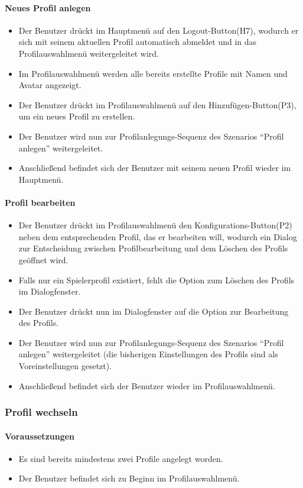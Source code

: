 \paragraph{Neues Profil anlegen}
\begin{itemize}
	\item Der Benutzer drückt im Hauptmenü auf den Logout-Button(H7), wodurch er sich mit seinem aktuellen Profil automatisch abmeldet und in das Profilauswahlmenü weitergeleitet wird.
	\item Im Profilauswahlmenü werden alle bereits erstellte Profile mit Namen und Avatar angezeigt.
	\item Der Benutzer drückt im Profilauswahlmenü auf den Hinzufügen-Button(P3), um ein neues Profil zu erstellen.
	\item Der Benutzer wird nun zur Profilanlegungs-Sequenz des Szenarios "`Profil anlegen"' weitergeleitet.
	\item Anschließend befindet sich der Benutzer mit seinem neuen Profil wieder im Hauptmenü.
\end{itemize}
\paragraph{Profil bearbeiten }
\begin{itemize}
	\item Der Benutzer drückt im Profilauswahlmenü den Konfigurations-Button(P2) neben dem entsprechenden Profil, das er bearbeiten will, wodurch ein Dialog zur Entscheidung zwischen Profilbearbeitung und dem Löschen des Profils geöffnet wird.
	\item Falls nur ein Spielerprofil existiert, fehlt die Option zum Löschen des Profils im Dialogfenster.
	\item Der Benutzer drückt nun im Dialogfenster auf die Option zur Bearbeitung des Profils. 
	\item Der Benutzer wird nun zur Profilanlegungs-Sequenz des Szenarios "`Profil anlegen"' weitergeleitet (die bisherigen Einstellungen des Profils sind als Voreinstellungen gesetzt).
	\item Anschließend befindet sich der Benutzer wieder im Profilauswahlmenü.
\end{itemize}

\subsubsection{Profil wechseln}
\paragraph{Voraussetzungen}
\begin{itemize}
	\item Es sind bereits mindestens zwei Profile angelegt worden.
	\item Der Benutzer befindet sich zu Beginn im Profilauswahlmenü.
\end{itemize}
